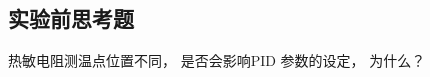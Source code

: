 \documentclass[dvipsnames, svgnames,a4paper,11pt]{article}
\begin{document}









\clearpage

\subsection{实验前思考题}



\begin{question}
	热敏电阻测温点位置不同， 是否会影响PID 参数的设定， 为什么？
\end{question}
\end{document}
